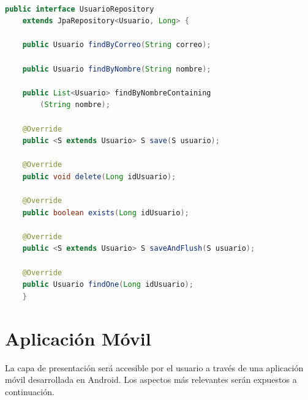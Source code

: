 	
	
	
	
\begin{lstlisting}[language=java,caption={JpaRepository},label=DescriptiveLabel]
    
public interface UsuarioRepository 
	extends JpaRepository<Usuario, Long> {

	public Usuario findByCorreo(String correo);

	public Usuario findByNombre(String nombre);

	public List<Usuario> findByNombreContaining
		(String nombre);

	@Override
	public <S extends Usuario> S save(S usuario);

	@Override
	public void delete(Long idUsuario);

	@Override
	public boolean exists(Long idUsuario);

	@Override
	public <S extends Usuario> S saveAndFlush(S usuario);

	@Override
	public Usuario findOne(Long idUsuario);
	}


\end{lstlisting} 
	
	
	
	
\section{Aplicación Móvil}
La capa de presentación será accesible por el usuario a través de una aplicación móvil desarrollada en Android. Los aspectos más relevantes serán expuestos a continuación.

